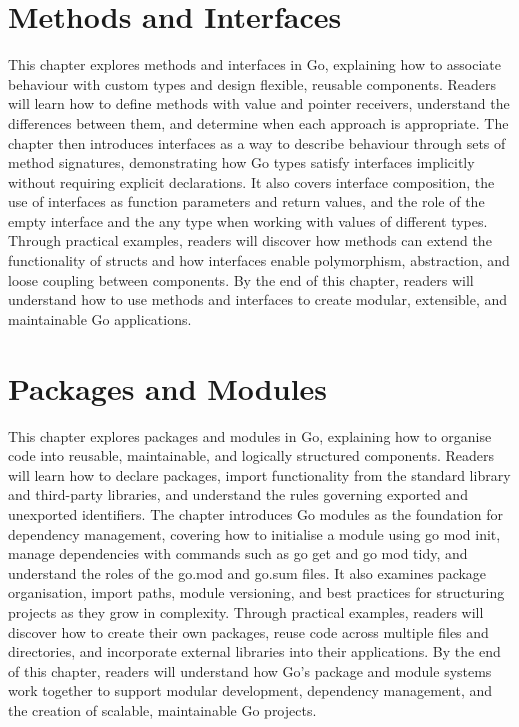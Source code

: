\documentclass[12pt,oneside]{book}
\begin{document}
\chapter{Methods and Interfaces}
\begin{chaptersummary}
This chapter explores methods and interfaces in Go, explaining how to associate behaviour with custom types and design flexible, reusable components. Readers will learn how to define methods with value and pointer receivers, understand the differences between them, and determine when each approach is appropriate. The chapter then introduces interfaces as a way to describe behaviour through sets of method signatures, demonstrating how Go types satisfy interfaces implicitly without requiring explicit declarations. It also covers interface composition, the use of interfaces as function parameters and return values, and the role of the empty interface and the any type when working with values of different types. Through practical examples, readers will discover how methods can extend the functionality of structs and how interfaces enable polymorphism, abstraction, and loose coupling between components. By the end of this chapter, readers will understand how to use methods and interfaces to create modular, extensible, and maintainable Go applications.
\end{chaptersummary}


\chapter{Packages and Modules}
\begin{chaptersummary}
This chapter explores packages and modules in Go, explaining how to organise code into reusable, maintainable, and logically structured components. Readers will learn how to declare packages, import functionality from the standard library and third-party libraries, and understand the rules governing exported and unexported identifiers. The chapter introduces Go modules as the foundation for dependency management, covering how to initialise a module using go mod init, manage dependencies with commands such as go get and go mod tidy, and understand the roles of the go.mod and go.sum files. It also examines package organisation, import paths, module versioning, and best practices for structuring projects as they grow in complexity. Through practical examples, readers will discover how to create their own packages, reuse code across multiple files and directories, and incorporate external libraries into their applications. By the end of this chapter, readers will understand how Go’s package and module systems work together to support modular development, dependency management, and the creation of scalable, maintainable Go projects.
\end{chaptersummary}

\end{document}
